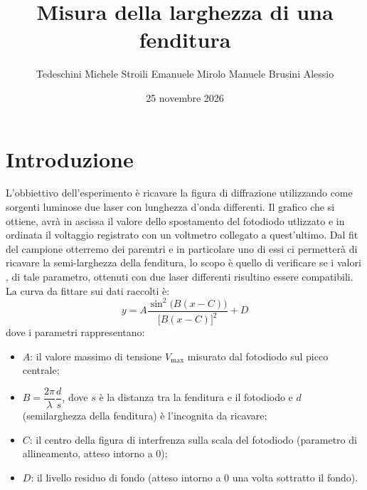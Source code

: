 \documentclass[10pt,twocolumn]{article}
\begin{document}
    \justifying

      \title{\textbf{Misura della larghezza di una fenditura}}
      \author{Tedeschini Michele \hspace{0.7cm} Stroili Emanuele \hspace{0.7cm} Mirolo Manuele \hspace{0.7cm} Brusini Alessio}
      \date{25 novembre 2026}
      \maketitle
      \onecolumn
      \tableofcontents
    \vspace{3cm}
      \begin{abstract}
        \centering
        \large


      \end{abstract}

      \newpage
    \restoregeometry
    \twocolumn
\section{Introduzione}
L'obbiettivo dell'esperimento è ricavare la figura di diffrazione utilizzando come sorgenti luminose due laser con lunghezza d'onda differenti. Il grafico che si ottiene, avrà in ascissa il valore dello spostamento del fotodiodo utlizzato e in ordinata il voltaggio registrato con un voltmetro collegato a quest'ultimo. Dal fit del campione otterremo dei paremtri e in particolare uno di essi ci permetterà di ricavare la semi-larghezza della fenditura, lo scopo è quello di verificare se i valori , di tale parametro, ottenuti con due laser differenti risultino essere compatibili.
La curva da fittare sui dati raccolti è:
\begin{equation*}
    y = A \frac{\sin^2\bigl(B(x - C)\bigr)}{\bigl[B(x - C)\bigr]^2} + D
\end{equation*}
dove i parametri rappresentano:
\begin{itemize}
    \item $A$: il valore massimo di tensione $V_{\max}$ misurato dal fotodiodo sul picco centrale;
    \item $B = \dfrac{2\pi}{\lambda} \dfrac{d}{s}$, dove $s$ è la distanza tra la fenditura e il fotodiodo e $d$ (semilarghezza della fenditura) è l'incognita da ricavare;
    \item $C$: il centro della figura di interfrenza sulla scala del fotodiodo (parametro di allineamento, atteso intorno a $0$);
    \item $D$: il livello residuo di fondo (atteso intorno a $0$ una volta sottratto il fondo).
\end{itemize}
\end{document}
